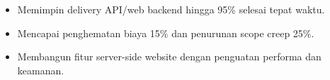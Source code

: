\vspace{4pt}
\begin{itemize}
  \item Memimpin delivery API/web backend hingga 95\% selesai tepat waktu.
  \item Mencapai penghematan biaya 15\% dan penurunan scope creep 25\%.
\end{itemize}
\vspace{4pt}
\begin{itemize}
  \item Membangun fitur server-side website dengan penguatan performa dan keamanan.
\end{itemize}